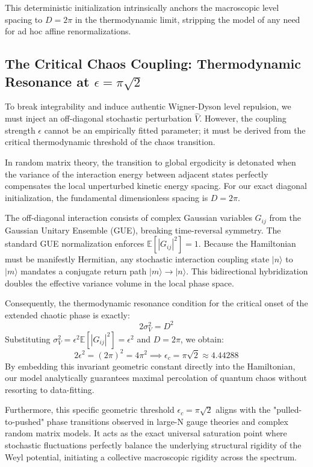 \documentclass[aps,prl,preprint,superscriptaddress,floatfix]{revtex4-2}
\begin{document}
This deterministic initialization intrinsically anchors the macroscopic level spacing to $D = 2\pi$ in the thermodynamic limit, stripping the model of any need for ad hoc affine renormalizations.

\subsection{The Critical Chaos Coupling: Thermodynamic Resonance at \texorpdfstring{$\epsilon = \pi \sqrt{2}$}{epsilon = pi sqrt(2)}}

To break integrability and induce authentic Wigner-Dyson level repulsion, we must inject an off-diagonal stochastic perturbation $\hat{V}$. However, the coupling strength $\epsilon$ cannot be an empirically fitted parameter; it must be derived from the critical thermodynamic threshold of the chaos transition.

In random matrix theory, the transition to global ergodicity is detonated when the variance of the interaction energy between adjacent states perfectly compensates the local unperturbed kinetic energy spacing. For our exact diagonal initialization, the fundamental dimensionless spacing is $D = 2\pi$.

The off-diagonal interaction consists of complex Gaussian variables $G_{ij}$ from the Gaussian Unitary Ensemble (GUE), breaking time-reversal symmetry. The standard GUE normalization enforces $\mathbb{E}[|G_{ij}|^2] = 1$. Because the Hamiltonian must be manifestly Hermitian, any stochastic interaction coupling state $|n\rangle$ to $|m\rangle$ mandates a conjugate return path $|m\rangle \to |n\rangle$. This bidirectional hybridization doubles the effective variance volume in the local phase space. 

Consequently, the thermodynamic resonance condition for the critical onset of the extended chaotic phase is exactly:
\begin{equation}
2 \sigma_V^2 = D^2
\end{equation}
Substituting $\sigma_V^2 = \epsilon^2 \mathbb{E}[|G_{ij}|^2] = \epsilon^2$ and $D = 2\pi$, we obtain:
\begin{equation}
2 \epsilon^2 = (2\pi)^2 = 4\pi^2 \implies \boxed{ \epsilon_c = \pi \sqrt{2} \approx 4.44288 }
\end{equation}
By embedding this invariant geometric constant directly into the Hamiltonian, our model analytically guarantees maximal percolation of quantum chaos without resorting to data-fitting.

Furthermore, this specific geometric threshold $\epsilon_c = \pi\sqrt{2}$ aligns with the "pulled-to-pushed" phase transitions observed in large-N gauge theories and complex random matrix models\cite{Gross1980, Cunden2018}. It acts as the exact universal saturation point where stochastic fluctuations perfectly balance the underlying structural rigidity of the Weyl potential, initiating a collective macroscopic rigidity across the spectrum.
\end{document}
